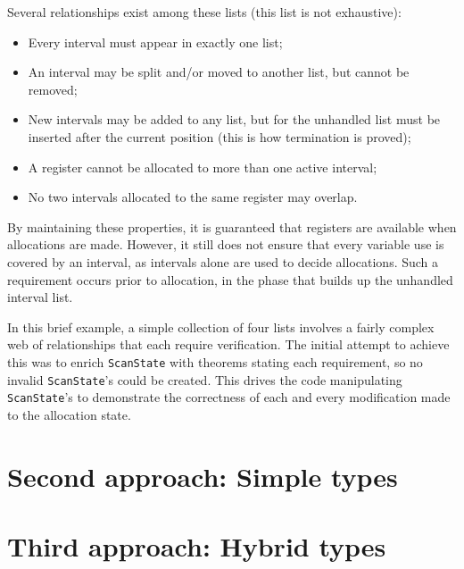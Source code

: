 \documentclass[preprint]{sigplanconf}
\begin{document}
Several relationships exist among these lists (this list is not exhaustive):

\begin{itemize}
\item Every interval must appear in exactly one list;
\item An interval may be split and/or moved to another list, but cannot be
  removed;
\item New intervals may be added to any list, but for the unhandled list must
  be inserted after the current position (this is how termination is proved);
\item A register cannot be allocated to more than one active interval;
\item No two intervals allocated to the same register may overlap.
\end{itemize}

By maintaining these properties, it is guaranteed that registers are available
when allocations are made. However, it still does not ensure that every
variable use is covered by an interval, as intervals alone are used to decide
allocations. Such a requirement occurs prior to allocation, in the phase that
builds up the unhandled interval list.

In this brief example, a simple collection of four lists involves a fairly
complex web of relationships that each require verification. The initial
attempt to achieve this was to enrich \verb|ScanState| with theorems stating
each requirement, so no invalid \verb|ScanState|'s could be created. This
drives the code manipulating \verb|ScanState|'s to demonstrate the correctness
of each and every modification made to the allocation state.

\section{Second approach: Simple types}

\section{Third approach: Hybrid types}
\end{document}
